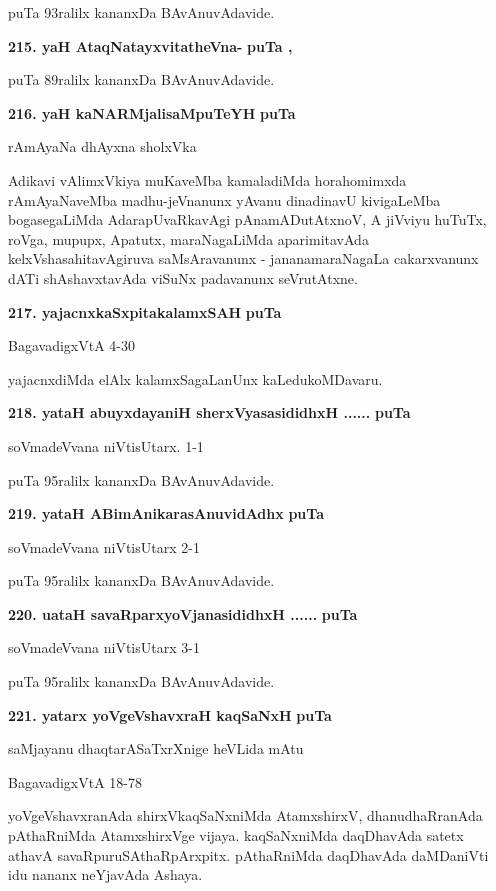 \smallskip
puTa 93ralilx kananxDa BAvAnuvAdavide.

\medskip
\noindent
\textbf{215. yaH AtaqNatayxvitatheVna-} \hfill{\bf puTa \pageref{48}, \pageref{91}}

\smallskip
puTa 89ralilx kananxDa BAvAnuvAdavide.

\medskip
\noindent
\textbf{216. yaH kaNARMjalisaMpuTeYH} \hfill{\bf puTa \pageref{238}}

\hfill{rAmAyaNa dhAyxna sholxVka}

\smallskip
Adikavi vAlimxVkiya muKaveMba kamaladiMda horahomimxda rAmAyaNa\-veMba madhu-jeVnanunx\- yAvanu dinadinavU kivigaLeMba bogasegaLiMda Adara\-pUvaRkavAgi pAnamADutAtxnoV, A jiVviyu huTuTx, roVga, mupupx, Apatutx, maraNagaLiMda aparimitavAda kelxVshasahitavAgiruva saMsAra\-vanunx - jananamaraNagaLa cakarxvanunx dATi shAshavxtavAda viSuNx padavanunx seVrutAtxne.

\medskip
\noindent
\textbf{217. yajacnxkaSxpitakalamxSAH} \hfill{\bf puTa \pageref{228}}

\hfill{BagavadigxVtA 4-30}

\smallskip
yajacnxdiMda elAlx kalamxSagaLanUnx kaLedukoMDavaru.

\medskip
\noindent
\textbf{218. yataH abuyxdayaniH sherxVyasasididhxH ......} \hfill{\bf puTa \pageref{94}}

\hfill{soVmadeVvana niVtisUtarx. 1-1}

\smallskip
puTa 95ralilx kananxDa BAvAnuvAdavide.

\medskip
\noindent
\textbf{219. yataH ABimAnikarasAnuvidAdhx} \hfill{\bf puTa \pageref{94}}

\hfill{soVmadeVvana niVtisUtarx 2-1}

\smallskip
puTa 95ralilx kananxDa BAvAnuvAdavide.

\medskip
\noindent
\textbf{220. uataH savaRparxyoVjanasididhxH ......} \hfill{\bf puTa \pageref{94}}

\hfill{soVmadeVvana niVtisUtarx 3-1}

\smallskip
puTa 95ralilx kananxDa BAvAnuvAdavide.

\medskip
\noindent
\textbf{221. yatarx yoVgeVshavxraH kaqSaNxH} \hfill{\bf puTa \pageref{73}}

\smallskip
saMjayanu dhaqtarASaTxrXnige heVLida mAtu

\hfill{BagavadigxVtA 18-78}

\smallskip
yoVgeVshavxranAda shirxVkaqSaNxniMda AtamxshirxV, dhanudhaRranAda pAthaRniMda AtamxshirxVge vijaya. kaqSaNxniMda daqDhavAda satetx athavA savaRpuruSAthaRpArxpitx. pAthaRniMda daqDhavAda daMDaniVti idu nananx neYjavAda Ashaya.

